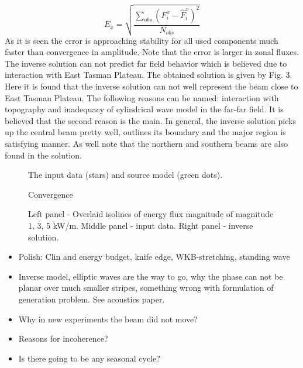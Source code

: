 \begin{equation}
E_{x} = \sqrt{\frac{\sum_{obs} (F_i^x - \hat{F}_i^x)^2}{N_{obs}}}
\end{equation}
As it is seen the error is approaching stability for all used components much faster than convergence in amplitude. Note that the error is larger in zonal fluxes. The inverse solution can not predict far field behavior which is believed due to interaction with East Tasman Plateau. The obtained solution is given by Fig. 3. Here it is found that the inverse solution can not well represent the beam close to East Tasman Plateau. The following reasons can be named: interaction with topography and inadequacy of cylindrical wave model in the far-far field. It is believed that the second reason is the main. In general, the inverse solution picks up the central beam pretty well, outlines its boundary and the major region is satisfying manner. As well note that the northern and southern beams are also found in the solution.

\begin{figure}
\centering
{}
\caption{The input data (stars) and source model (green dots).}
\label{invm_fig:1}
\end{figure}

\begin{figure}
\centering
{}
\caption{Convergence}
\end{figure}

\begin{figure}
\centering
{}
\caption{Left panel - Overlaid isolines of energy flux magnitude of magnitude 1, 3, 5 kW/m. Middle panel - input data. Right panel - inverse solution.}
\end{figure}


\begin{itemize}
\item Polish: Clin and energy budget, knife edge, WKB-stretching, standing wave
\item Inverse model, elliptic waves are the way to go, why the phase can not be planar over much smaller stripes, something wrong with formulation of generation problem. See acoustics paper.
\item Why in new experiments the beam did not move?
\item Reasons for incoherence?
\item Is there going to be any seasonal cycle?
\end{itemize}




